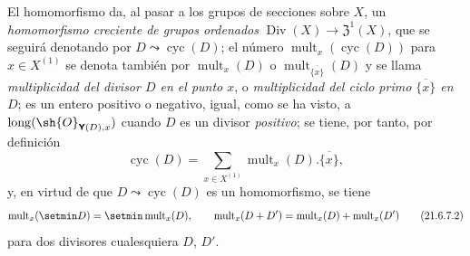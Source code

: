 \begin{env}[21.6.7]
\label{IV.21.6.7}
El homomorfismo  da, al pasar a los grupos de secciones sobre $X$, un \emph{homomorfismo creciente de grupos ordenados} $\operatorname{Div}(X)\to\mathfrak{Z}^1(X)$, que se seguirá denotando por $D\leadsto\operatorname{cyc}(D)$;
el número $\operatorname{mult}_x(\operatorname{cyc}(D))$ para $x\in X^{(1)}$ se denota también por $\operatorname{mult}_x(D)$ o $\operatorname{mult}_{\overline{\{x\}}}(D)$ y se llama \emph{multiplicidad del divisor $D$ en el punto $x$}, o \emph{multiplicidad del ciclo primo $\overline{\{x\}}$ en $D$};
es un entero positivo o negativo, igual, como se ha visto, a $\operatorname{long}(\sh{O}_{\boldsymbol{\mathsf Y}(D),x})$ cuando $D$ es un divisor \emph{positivo};
se tiene, por tanto, por definición
\[
\label{IV.21.6.7.1}
  \operatorname{cyc}(D)=\sum_{x\in X^{(1)}}\operatorname{mult}_x(D).\overline{\{x\}},
  \tag{21.6.7.1}
\]
y, en virtud de que $D\leadsto\operatorname{cyc}(D)$ es un homomorfismo, se tiene
\[
\label{IV.21.6.7.2}
  \operatorname{mult}_x(\setmin D)=\setmin\operatorname{mult}_x(D),\qquad
  \operatorname{mult}_x(D+D')=\operatorname{mult}_x(D)+\operatorname{mult}_x(D')
  \tag{21.6.7.2}
\]
para dos divisores cualesquiera $D$, $D'$.


\end{env}

